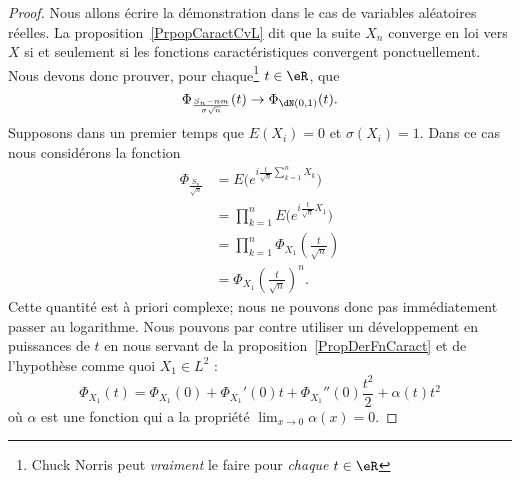 \begin{proof}
	Nous allons écrire la démonstration dans le cas de variables aléatoires réelles. La proposition~\ref{PrpopCaractCvL} dit que la suite \( X_n\) converge en loi vers \( X\) si et seulement si les fonctions caractéristiques convergent ponctuellement. Nous devons donc prouver, pour chaque\footnote{Chuck Norris peut \emph{vraiment} le faire pour \emph{chaque} \( t\in\eR\)} \( t\in\eR\), que
	\begin{equation}        \label{EqPhitophidNtznu}
		\Phi_{\frac{ S_n-nm }{ \sigma\sqrt{n} }}(t)\to\Phi_{\dN(0,1)}(t).
	\end{equation}
	Supposons dans un premier temps que \( E(X_i)=0\) et \( \sigma(X_i)=1\). Dans ce cas nous considérons la fonction
	\begin{subequations}
		\begin{align}
			\Phi_{\frac{ S_n }{ \sqrt{n} }} & =E\big(  e^{i\frac{ t }{ \sqrt{n} }\sum_{k=1}^nX_k} \big)     \\
			                                & =\prod_{k=1}^nE\big(  e^{i\frac{ t }{ \sqrt{n} }X_1} \big)    \\
			                                & =\prod_{k=1}^n\Phi_{X_1}\left( \frac{ t }{ \sqrt{n} } \right) \\
			                                & =\Phi_{X_1}\left( \frac{ t }{ \sqrt{n} } \right)^n.
		\end{align}
	\end{subequations}
	Cette quantité est à priori complexe; nous ne pouvons donc pas immédiatement passer au logarithme. Nous pouvons par contre utiliser un développement en puissances de \( t\) en nous servant de la proposition~\ref{PropDerFnCaract} et de l'hypothèse comme quoi \( X_1\in L^2\) :
	\begin{equation}
		\Phi_{X_1}(t)=\Phi_{X_1}(0)+\Phi_{X_1}'(0)t+\Phi_{X_1}''(0)\frac{ t^2 }{2}+\alpha(t)t^2
	\end{equation}
	où \( \alpha\) est une fonction qui a la propriété \( \lim_{x\to 0} \alpha(x)=0\).


\end{proof}
